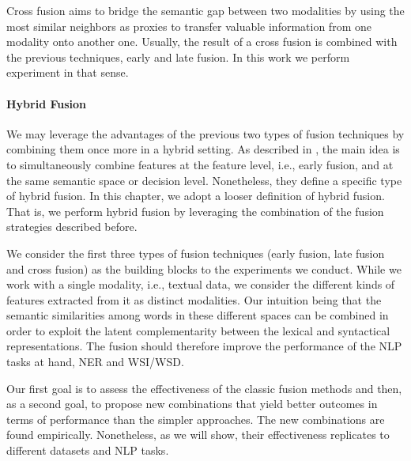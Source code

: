 Cross fusion aims to bridge the semantic gap between two modalities by using the most similar neighbors as proxies to transfer valuable information  from one modality onto another one. Usually, the result of a cross fusion is combined with the previous techniques, early and late fusion. In this work we perform  experiment in that sense.

\paragraph{Hybrid Fusion}
We may leverage the advantages of the previous two types of fusion techniques by combining them once more in a hybrid setting. As described in \cite{AtreyHEK10,yu2014informedia}, the main idea is to simultaneously combine features at the feature level, i.e., early fusion, and at the same semantic space or decision level. Nonetheless, they define a specific type of hybrid fusion. In this chapter, we adopt a looser definition of hybrid fusion. That is, we perform hybrid fusion by leveraging the combination of the fusion strategies described before.

We consider the first three types of fusion techniques (early fusion, late fusion and cross fusion) as the building blocks to the experiments we conduct.  While we work with a single modality, i.e., textual data, we consider the different kinds of features extracted from it as distinct modalities. Our intuition being that the semantic similarities among words in these different spaces can be combined in order to exploit the latent complementarity between the lexical and syntactical representations. The fusion should therefore improve the performance of the NLP tasks at hand, NER and WSI/WSD.

Our first goal is to assess the effectiveness of the classic fusion methods and then, as a second goal, to propose new combinations that yield better outcomes in terms of performance than the simpler approaches. The new combinations are found empirically. Nonetheless, as we will show, their effectiveness replicates to different datasets and NLP tasks. 
%
%

